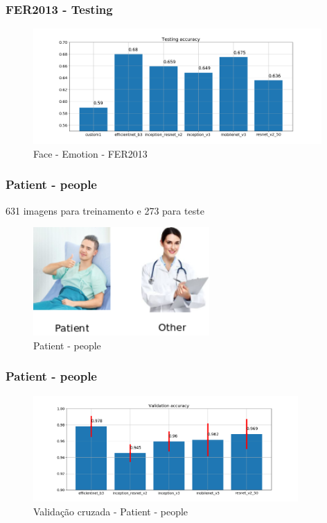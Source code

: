 \begin{frame}
\frametitle{\textbf{FER2013} - Testing}
\begin{figure}[!ht]
    \centering
    \caption{Face - Emotion - FER2013}
    \includegraphics[width=0.98\textwidth]{images/face_emotion_fer2013/testing.png}
\end{figure}
\end{frame}



\begin{frame}
\frametitle{\textbf{Patient - people}}
631 imagens para treinamento e 273 para teste
\begin{figure}[!ht]
    \centering
    \caption{Patient - people}
    \includegraphics[width=0.6\textwidth]{images/cnn_patient_people/0-info.png}
\end{figure}
\end{frame}


\begin{frame}
\frametitle{\textbf{Patient - people}}
\begin{figure}[!ht]
    \centering
    \caption{Validação cruzada - Patient - people}
    \includegraphics[width=0.9\textwidth]{images/cnn_patient_people/crossval.png}
\end{figure}
\end{frame}

